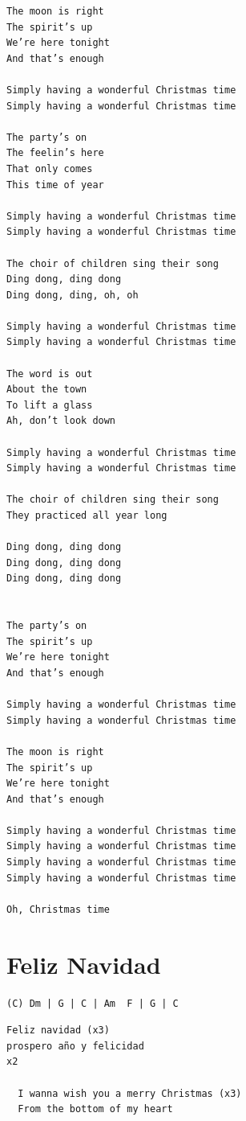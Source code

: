 \documentclass[
]{article}
\begin{document}
\begin{verbatim}
The moon is right
The spirit’s up
We’re here tonight
And that’s enough

Simply having a wonderful Christmas time
Simply having a wonderful Christmas time

The party’s on
The feelin’s here
That only comes
This time of year

Simply having a wonderful Christmas time
Simply having a wonderful Christmas time

The choir of children sing their song
Ding dong, ding dong
Ding dong, ding, oh, oh

Simply having a wonderful Christmas time
Simply having a wonderful Christmas time

The word is out
About the town
To lift a glass
Ah, don’t look down

Simply having a wonderful Christmas time
Simply having a wonderful Christmas time

The choir of children sing their song
They practiced all year long

Ding dong, ding dong
Ding dong, ding dong
Ding dong, ding dong


The party’s on
The spirit’s up
We’re here tonight
And that’s enough

Simply having a wonderful Christmas time
Simply having a wonderful Christmas time

The moon is right
The spirit’s up
We’re here tonight
And that’s enough

Simply having a wonderful Christmas time
Simply having a wonderful Christmas time
Simply having a wonderful Christmas time
Simply having a wonderful Christmas time

Oh, Christmas time
\end{verbatim}

\hypertarget{feliz-navidad}{%
\section{Feliz Navidad}\label{feliz-navidad}}

\begin{verbatim}
(C) Dm | G | C | Am  F | G | C
\end{verbatim}

\begin{verbatim}
Feliz navidad (x3)
prospero año y felicidad 
x2

  I wanna wish you a merry Christmas (x3)
  From the bottom of my heart
\end{verbatim}
\end{document}
